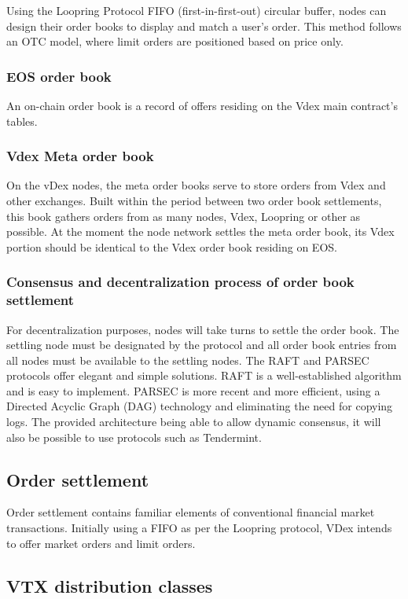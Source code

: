 \documentclass[]{article}
\begin{document}
{Using the Loopring Protocol FIFO (first-in-first-out) circular buffer, nodes can design their order books to display and match a user’s order. This method follows an OTC model, where limit orders are positioned based on price only. \cite{7}  

\subsubsection{EOS order book}
An on-chain order book is a record of offers residing on the Vdex main contract's tables. 

\subsubsection{Vdex Meta order book}
On the vDex nodes, the meta order books serve to store orders from Vdex and other exchanges. 
Built within the period between two order book settlements, this book gathers orders from as many nodes, Vdex, Loopring or other as possible. At the moment the node network settles the meta order book, its Vdex portion should be identical to the Vdex order book residing on EOS.

\subsubsection{Consensus and decentralization process of order book settlement}
For decentralization purposes, nodes will take turns to settle the order book. 
The settling node must be designated by the protocol and all order book entries from all nodes must be available to the settling nodes. 
The RAFT\cite{18} and PARSEC\cite{23} protocols offer elegant and simple solutions. 
RAFT is a well-established algorithm and is easy to implement. PARSEC is more recent and more efficient, using a Directed Acyclic Graph (DAG) technology and eliminating the need for copying logs.
The provided architecture being able to allow dynamic consensus, it will also be possible to use protocols such as Tendermint.

\subsection{Order settlement}
Order settlement contains familiar elements of conventional financial market transactions. Initially using a FIFO as per the Loopring protocol, VDex intends to offer market orders and limit orders. 

\subsection{VTX distribution classes}

}
\end{document}
